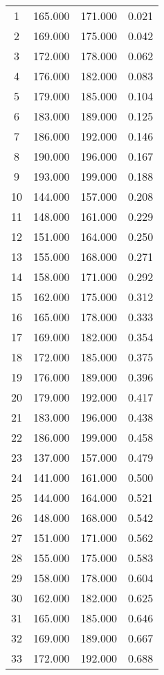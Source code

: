 % 
\begin{tabular}{cccc}
  \hline
  \hline
1 & 165.000 & 171.000 & 0.021 \\ 
  2 & 169.000 & 175.000 & 0.042 \\ 
  3 & 172.000 & 178.000 & 0.062 \\ 
  4 & 176.000 & 182.000 & 0.083 \\ 
  5 & 179.000 & 185.000 & 0.104 \\ 
  6 & 183.000 & 189.000 & 0.125 \\ 
  7 & 186.000 & 192.000 & 0.146 \\ 
  8 & 190.000 & 196.000 & 0.167 \\ 
  9 & 193.000 & 199.000 & 0.188 \\ 
  10 & 144.000 & 157.000 & 0.208 \\ 
  11 & 148.000 & 161.000 & 0.229 \\ 
  12 & 151.000 & 164.000 & 0.250 \\ 
  13 & 155.000 & 168.000 & 0.271 \\ 
  14 & 158.000 & 171.000 & 0.292 \\ 
  15 & 162.000 & 175.000 & 0.312 \\ 
  16 & 165.000 & 178.000 & 0.333 \\ 
  17 & 169.000 & 182.000 & 0.354 \\ 
  18 & 172.000 & 185.000 & 0.375 \\ 
  19 & 176.000 & 189.000 & 0.396 \\ 
  20 & 179.000 & 192.000 & 0.417 \\ 
  21 & 183.000 & 196.000 & 0.438 \\ 
  22 & 186.000 & 199.000 & 0.458 \\ 
  23 & 137.000 & 157.000 & 0.479 \\ 
  24 & 141.000 & 161.000 & 0.500 \\ 
  25 & 144.000 & 164.000 & 0.521 \\ 
  26 & 148.000 & 168.000 & 0.542 \\ 
  27 & 151.000 & 171.000 & 0.562 \\ 
  28 & 155.000 & 175.000 & 0.583 \\ 
  29 & 158.000 & 178.000 & 0.604 \\ 
  30 & 162.000 & 182.000 & 0.625 \\ 
  31 & 165.000 & 185.000 & 0.646 \\ 
  32 & 169.000 & 189.000 & 0.667 \\ 
  33 & 172.000 & 192.000 & 0.688 \\ 

\end{tabular}
